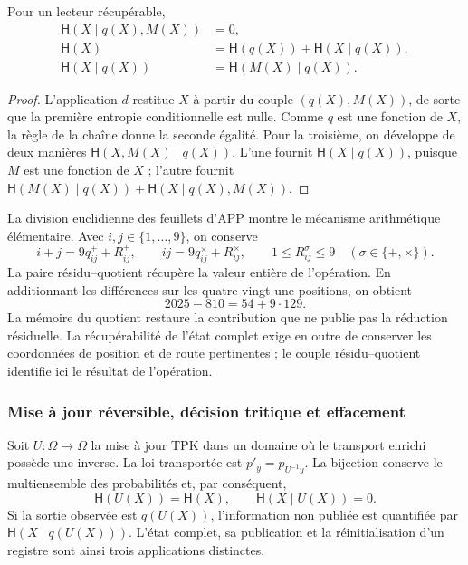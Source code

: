 \begin{proposition}
Pour un lecteur récupérable,
\begin{align}
 \mathsf H(X\mid q(X),M(X))&=0,\\
 \mathsf H(X)&=\mathsf H(q(X))+\mathsf H(X\mid q(X)),\\
 \mathsf H(X\mid q(X))&=\mathsf H(M(X)\mid q(X)).
 \label{ii:eq:ii-kb-aut-fibra}
\end{align}
\end{proposition}
\begin{proof}
L'application \(d\) restitue \(X\) à partir du couple \((q(X),M(X))\),
de sorte que la première entropie conditionnelle est nulle. Comme \(q\) est
une fonction de \(X\), la règle de la chaîne donne la seconde égalité.
Pour la troisième, on développe de deux manières
\(\mathsf H(X,M(X)\mid q(X))\). L'une fournit
\(\mathsf H(X\mid q(X))\), puisque \(M\) est une fonction de \(X\) ;
l'autre fournit
\(\mathsf H(M(X)\mid q(X))+\mathsf H(X\mid q(X),M(X))\).
\end{proof}

La division euclidienne des feuillets d'APP montre le mécanisme
arithmétique élémentaire. Avec \(i,j\in\{1,\ldots,9\}\), on conserve
\[
 i+j=9q^+_{ij}+R^+_{ij},\qquad
 ij=9q^\times_{ij}+R^\times_{ij},\qquad
 1\leq R^\sigma_{ij}\leq9\quad(\sigma\in\{+,\times\}).
\]
La paire résidu--quotient récupère la valeur entière de l'opération. En additionnant les différences sur les quatre-vingt-une positions, on obtient
\[
 2025-810=54+9\cdot129.
\]
La mémoire du quotient restaure la contribution que ne publie pas la
réduction résiduelle. La récupérabilité de l'état complet exige
en outre de conserver les coordonnées de position et de route pertinentes ;
le couple résidu--quotient identifie ici le résultat de l'opération.

\subsubsection{Mise à jour réversible, décision tritique et effacement}

Soit \(U:\Omega\to\Omega\) la mise à jour TPK dans un domaine où le transport enrichi possède une inverse. La loi transportée est \(p'_y=p_{U^{-1}y}\). La bijection conserve le multiensemble des probabilités et, par conséquent,
\begin{equation}
 \mathsf H(U(X))=\mathsf H(X),\qquad
 \mathsf H(X\mid U(X))=0.
 \label{ii:eq:ii-kb-aut-reversible}
\end{equation}
Si la sortie observée est \(q(U(X))\), l'information non publiée
est quantifiée par \(\mathsf H(X\mid q(U(X)))\). L'état complet,
sa publication et la réinitialisation d'un registre sont ainsi trois applications distinctes.

